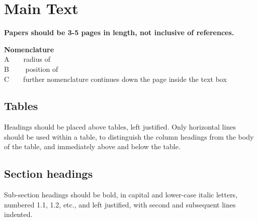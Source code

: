 \documentclass[10pt,twoside]{article}
\begin{document}
\clearpage
\section{Main Text}
\textbf{\textcolor[HTML]{70AD47}{Papers should be 3-5 pages in length, not inclusive of references. }} \hfill

\vspace{1\baselineskip}

\begin{framed}
\textbf{Nomenclature} \\
\normalsize    
    A\ \ \ \ radius of \\    
    B \ \ \ \ position of \\    
    C\ \ \ \ further nomenclature continues down the page inside the text box \\
\end{framed}


\subsection{Tables}
Headings should be placed above tables, left justified. Only horizontal lines should be used within a table, to distinguish the column headings from the body of the table, and immediately above and below the table.

\subsection{Section headings}
Sub-section headings should be bold, in capital and lower-case italic letters, numbered 1.1, 1.2, etc., and left justified, with second and subsequent lines indented. 

\end{document}
